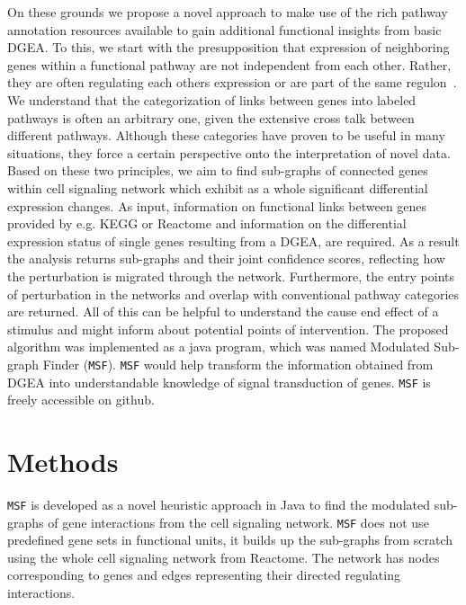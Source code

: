 \documentclass[twocolumn]{article}
\begin{document}
On these grounds we propose a novel approach to make use of the rich
pathway annotation resources available to gain additional functional
insights from basic DGEA. To this, we
start with the presupposition that expression of neighboring genes
within a functional pathway are not independent from each
other. Rather, they are often regulating each others expression or are
part of the same regulon~\cite{Michalak}. We
understand that the categorization of links between genes into labeled
pathways is often an arbitrary one, given the extensive cross talk
between different pathways. Although these categories have proven to be
useful in many situations, they force a certain perspective onto the
interpretation of novel data. Based on these two principles, we aim to
find sub-graphs of connected genes within cell signaling network which exhibit as a whole
significant differential expression changes. As input, information on
functional links between genes provided by e.g. KEGG or Reactome and
information on the differential expression status of single genes
resulting from a DGEA, are required. As a result the analysis returns
sub-graphs and their joint confidence scores, reflecting how the
perturbation is migrated through the network. Furthermore, the entry
points of perturbation in the networks and overlap with conventional
pathway categories are returned. All of this can be helpful to
understand the cause end effect of a stimulus and might inform about
potential points of intervention. The proposed algorithm was
implemented as a java program, which was named Modulated Sub-graph
Finder (\texttt{MSF}). \texttt{MSF} would help transform the information obtained from DGEA into understandable knowledge of signal transduction of genes. \texttt{MSF} is freely accessible on github.

\section*{Methods}
\texttt{MSF} is developed as a novel heuristic approach in Java to
find the modulated sub-graphs of gene interactions from the cell
signaling network. \texttt{MSF} does not use predefined gene sets in functional units, it builds up the sub-graphs from scratch using the whole cell signaling network from Reactome. The network has nodes corresponding to genes and edges representing their directed regulating interactions. 
\end{document}
